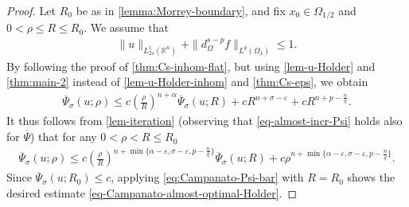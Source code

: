 \documentclass[11pt,reqno]{amsart}
\theoremstyle{plain}
\theoremstyle{definition}
\numberwithin{equation}{section}
\newcommand{\R}{\mathbb{R}}
\newcommand{\1}{\mathbbm{1}}
\begin{document}
\begin{proof}
Let $R_0$ be as in \autoref{lemma:Morrey-boundary}, and fix $x_0 \in \Omega_{1/2}$ and $0<\rho\leq R\leq R_0$. We assume that 
\begin{align*}
\|u\|_{L^1_{2s}(\R^n)} + \|d^{s-p}_{\Omega} f\|_{L^q(\Omega_1)} \le 1.
\end{align*}
By following the proof of \autoref{thm:Cs-inhom-flat}, but using \autoref{lem-u-Holder} and \autoref{thm:main-2} instead of \autoref{lem-u-Holder-inhom} and \autoref{thm:Cs-eps}, we obtain
\begin{align*}
    \overline{\Psi}_{\sigma}(u; \rho) \leq c \left( \frac{\rho}{R} \right)^{n+\alpha} \overline{\Psi}_{\sigma}(u; R) + cR^{n+\sigma-\varepsilon} + c R^{n + p-\frac{n}{q}}.
\end{align*}
It thus follows from \autoref{lem-iteration} (observing that \eqref{eq-almost-incr-Psi} holds also for $\overline{\Psi}$) that for any $0<\rho<R\leq R_0$
\begin{align}\label{eq:Campanato-Psi-bar}
    \overline{\Psi}_{\sigma}(u; \rho) \leq c \left( \frac{\rho}{R} \right)^{n+\min\{\alpha-\varepsilon,\sigma-\varepsilon, p - \frac{n}{q}\}} \overline{\Psi}_{\sigma}(u; R) + c\rho^{n+\min\{\alpha-\varepsilon,\sigma-\varepsilon, p - \frac{n}{q}\}}.
\end{align}
 Since $\overline{\Psi}_{\sigma}(u; R_0) \leq c$, applying \eqref{eq:Campanato-Psi-bar} with $R = R_0$ shows the desired estimate \eqref{eq-Campanato-almost-optimal-Holder}.


\end{proof}
\end{document}
